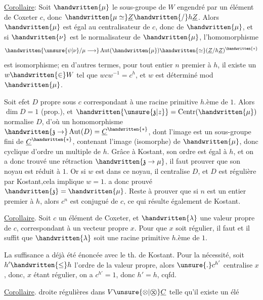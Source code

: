 \uline{Corollaire}: Soit $\handwritten{\mu}$ le sous-groupe de $W$ engendré par un élément de Coxeter $c$, donc $\handwritten{\mu\simeq}\underline{Z}\handwritten{/}h\underline{Z}$. Alors $\handwritten{\mu}$ est égal au centralisateur de $c$, donc de $\handwritten{\mu}$, et si $\handwritten{\nu}$ est le normalisateur de $\handwritten{\mu}$, l'homomorphisme
\[
\handwritten{\unsure{\psi|\nu}/\mu\longrightarrow}\operatorname{Aut}(\handwritten{\mu})\handwritten{\simeq}(\underline{Z}/h\underline{Z})^{\handwritten{*}}
\]
\margin{\handwritten{\shortstack[l]{Quelle extension\\de $(\unsure{Z|\mathbb{Z}}/hZ]^{*}$ par\\$\mathbb{Z}/h\mathbb{Z}$ \unsure{obtient-on} ?}}}
est  isomorphisme; en d'autres termes, pour tout entier $n$ premier à $h$, il existe un $w\handwritten{\in}W$ tel que $wcw^{-1}=c^h$, et $w$ est déterminé mod $\handwritten{\mu}$.

Soit  efet $D$  propre sous $c$ correspondant à une racine primitive $h$.ème de $1$. Alors $\dim D=1$ (prop.), et $\handwritten{\unsure{\mathfrak{z}|z}}=\operatorname{Centr}(\handwritten{\mu})$ normalise $D$, d'où un homomorphisme $\handwritten{\mathfrak{z}\to}\operatorname{Aut}(D)=\underline{C}^{\handwritten{*}}$, dont l'image est un sous-groupe fini de $\underline{C}^{\handwritten{*}}$, contenant l'image (isomorphe) de $\handwritten{\mu}$, donc cyclique d'ordre un multiple de $h$. Grâce à Kostant, son ordre est égal à $h$, et on a donc trouvé une rétraction $\handwritten{\mathfrak{z}\to\mu}$, il faut prouver que son noyau est réduit à $1$. Or si $w$ est dans ce noyau, il  centralise $D$, et  $D$ est régulière par Kostant,cela implique $w=1$.  a donc prouvé $\handwritten{\mathfrak{z}}=\handwritten{\mu}$. Reste à prouver que si $n$ est un entier premier à $h$, alors $c^n$ est conjugué de $c$, ce qui résulte également de Kostant.

\uline{Corollaire}. Soit $c$ un élément de Coxeter, et $\handwritten{\lambda}$ une valeur propre de $c$, correspondant à un vecteur propre $x$. Pour que $x$ soit régulier, il faut et il suffit que $\handwritten{\lambda}$ soit une racine primitive $h$.ème de $1$.

La suffisance a déjà été énoncée avec le th. de Kostant. Pour la nécessité, soit $h'\handwritten{\leq}h$ l'ordre de la valeur propre, alors $\unsure{\mathbin{.}}c^{h'}$ centralise $x$, donc, $x$ étant régulier, on a $c^{h'}=1$, donc $h'=h$, cqfd.

\uline{Corollaire}.   droite régulières dans $V\unsure{\otimes|\mathbin{\text{\textcircled{x}}}}\underline{C}$ telle qu'il existe un élé%
